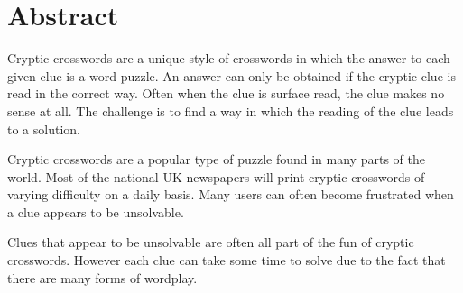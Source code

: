 \section*{Abstract}

Cryptic crosswords are a unique style of crosswords in which the answer to each
given clue is a word puzzle. An answer can only be obtained if the cryptic clue
is read in the correct way. Often when the clue is surface read, the clue makes
no sense at all. The challenge is to find a way in which the reading of the 
clue leads to a solution.

Cryptic crosswords are a popular type of puzzle found in many parts of the 
world. Most of the national UK newspapers will print cryptic crosswords of 
varying difficulty on a daily basis. Many users can often become frustrated 
when a clue appears to be unsolvable.


Clues that appear to be unsolvable are often all part of the fun of cryptic 
crosswords. However each clue can take some time to solve due to the fact that 
there are many forms of wordplay.